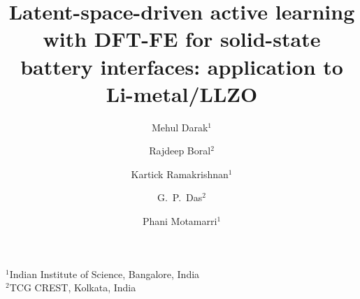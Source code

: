 \documentclass[11pt]{article}
\begin{document}

\title{Latent-space-driven active learning with DFT-FE for solid-state battery
interfaces: application to Li-metal/LLZO}


\author{
Mehul Darak$^{1}$ \and
Rajdeep Boral$^{2}$ \and
Kartick Ramakrishnan$^{1}$ \and
G.~P.~Das$^{2}$ \and
Phani Motamarri$^{1}$
}

\date{}
\maketitle

\noindent
$^{1}$Indian Institute of Science, Bangalore, India \\
$^{2}$TCG CREST, Kolkata, India \\

\vspace{1em}

\end{document}
